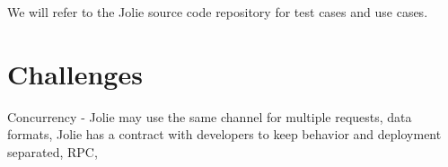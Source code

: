 We will refer to the Jolie source code repository for test cases and use cases.
\section{Challenges}
Concurrency - Jolie may use the same channel for multiple requests, data formats, Jolie has a contract with developers to keep behavior and deployment separated, RPC,
\newpage
\begin{comment}
\begin{figure}[H]
  \texttt{[image: illustrations/UseCase\_ver1.png]}
  \caption{Usecase version 1.1}
  \label{dailyscrum}
\end{figure}
\begin{figure}[H]
  \texttt{[image: illustrations/UseCase\_ver2.png]}
  \caption{Usecase version 2.0}
  \label{burndown}
\end{figure}
\end{comment}